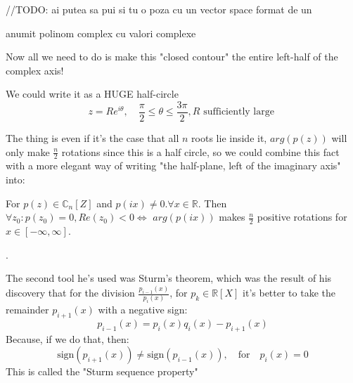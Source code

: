 \hfill\break
//TODO: ai putea sa pui si tu o poza cu un vector space format de un
\hfill\break

anumit polinom complex cu valori complexe

Now all we need to do is make this "closed contour" the entire
left-half of the complex axis!

We could write it as a {\large HUGE} half-circle
\[
z = Re^{i \theta}, \quad \frac{\pi}{2} \leq \theta \leq \frac{3
\pi}{2}, R \text{ sufficiently large }
\]

The thing is even if it's the case that all $n$ roots lie inside it,
$arg(p(z))$ will only make $\frac{n}{2}$ rotations since this is a
half circle, so we could combine this fact with a more elegant way of
writing "the half-plane, left of the imaginary axis" into:

\begin{lemma}\label{cauchy_arg_lemma}
For $p(z) \in \mathbb{C}_n[Z]$ and $p(ix) \neq 0. \forall x \in
\mathbb{R}$. Then $\forall z_0 : p(z_0) = 0, Re(z_0) < 0 \iff$
$arg(p(ix))$ makes $\frac{n}{2}$ positive rotations for $x \in
[-\infty , \infty]$.
\end{lemma}

.

The second tool he's used was Sturm's theorem, which was the result
of his discovery that for the division $\frac{p_{i-1}(x)}{p_i(x)}$,
for $p_k \in \mathbb{R}[X]$ it's better to take the remainder
$p_{i+1}(x)$ with a negative sign:
\begin{equation}\label{euclid_algorithm}
p_{i-1}(x) = p_i(x) q_i(x) - p_{i+1}(x) \tag{Euclid's Algorithm}
\end{equation}
Because, if we do that, then:
\begin{equation}\label{sturm_seq_property}
\text{sign} ( p_{i+1}(x) )  \neq \text{sign} ( p_{i-1}(x) ), \quad
\text{for} \quad p_i(x)=0 \tag{Sturm. Seq. Property}
\end{equation}
This is called the "Sturm sequence property"

